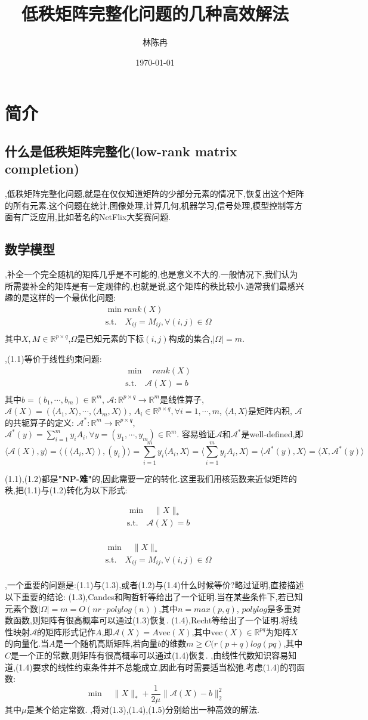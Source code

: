 \documentclass[UTF8]{ctexart}
\title{低秩矩阵完整化问题的几种高效解法}
\author{林陈冉}
\date{\today}
\newcommand{\s}{\quad}
\renewcommand{\b}{\textbf}
\newcommand{\p}{\paragraph{}\s}
\newcommand{\sect}{\section}
\newcommand{\ssect}{\subsection}
\newcommand{\equSplit}[1]{\begin{equation}\begin{split}#1\end{split}\end{equation}}
\newcommand{\equ}[1]{\begin{equation}#1\end{equation}}
\newcommand{\Tst}{\text{s.t.}\s}
\newcommand{\abs}[1]{\lvert#1\rvert}
\newcommand{\norm}[1]{\lVert#1\rVert}
\newcommand{\inprod}[1]{\langle#1\rangle}
\newcommand{\Real}[1]{\mathbb{R}^{#1}}
\newcommand{\nunorm}{\norm{X}_*}
\newcommand{\Ma}{\mathcal{A}}
\numberwithin{equation}{section}
\begin{document}
\maketitle
	\sect{简介}
		\ssect{什么是低秩矩阵完整化(low-rank matrix completion)}

		,低秩矩阵完整化问题,就是在仅仅知道矩阵的少部分元素的情况下,恢复出这个矩阵的所有元素.这个问题在统计,图像处理,计算几何,机器学习,信号处理,模型控制等方面有广泛应用,比如著名的NetFlix大奖赛问题.

		\ssect{数学模型}

		,补全一个完全随机的矩阵几乎是不可能的,也是意义不大的.一般情况下,我们认为所需要补全的矩阵是有一定规律的,也就是说,这个矩阵的秩比较小.通常我们最感兴趣的是这样的一个最优化问题:
		\equSplit{
			&\min rank(X)\\
			&\Tst X_{ij}=M_{ij},\forall(i,j)\in\Omega\\
		}
		其中$X,M\in\Real{p\times q}$,$\Omega$是已知元素的下标$(i,j)$构成的集合,$\abs{\Omega}=m$.

		,(1.1)等价于线性约束问题:
		\equSplit{
			&\min\s rank(X)\\
			&\Tst \mathcal{A}(X)=b\\
		}
		其中$b=(b_1,\cdots,b_m)\in\Real{m}$,
		$\mathcal{A}:\Real{p\times q}\rightarrow\Real{m}$是线性算子,
		$\Ma(X)=(\inprod{A_1,X},\cdots,\inprod{A_m,X})$,
		$A_i\in\Real{p\times q},\forall i=1,\cdots,m$,
		$\inprod{A,X}$是矩阵内积,
		$\Ma$的共轭算子的定义:
		$\Ma^*:\Real{m}\rightarrow\Real{p\times q}$,
		$\Ma^*(y)=\sum^m_{i=1}y_iA_i,\forall y=(y_1,\cdots,y_m)\in\Real{m}$.
		容易验证$\Ma$和$\Ma^*$是well-defined,即
		\[
			\inprod{\Ma(X),y}=\inprod{(\inprod{A_i,X}),(y_i)}=
			\sum^m_{i=1}y_i\inprod{A_i,X}=\inprod{\sum^m_{i=1}y_iA_i,X}
			=\inprod{\Ma^*(y),X}=\inprod{X,\Ma^*(y)}
		\]

		(1.1),(1.2)都是\b{"NP-难"}的,因此需要一定的转化.这里我们用核范数来近似矩阵的秩,把(1.1)与(1.2)转化为以下形式:

		\equSplit{
			&\min\s\nunorm\\
			&\Tst \mathcal{A}(X)=b\\	
		}

		\equSplit{
			&\min\s\nunorm\\
			&\Tst X_{ij}=M_{ij},\forall(i,j)\in\Omega\\
		}

		,一个重要的问题是:(1.1)与(1.3),或者(1.2)与(1.4)什么时候等价?略过证明,直接描述以下重要的结论:
		(1.3),Candes和陶哲轩等给出了一个证明.当在某些条件下,若已知元素个数$\abs{\Omega}=m=O(nr\cdot polylog(n))$,其中$n=max(p,q)$, $polylog$是多重对数函数,则矩阵有很高概率可以通过(1.3)恢复.
		(1.4),Recht等给出了一个证明.将线性映射$\mathcal{A}$的矩阵形式记作$A$,即$\mathcal{A}(X)=A\text{vec}(X)$,其中$\text{vec}(X)\in\Real{pq}$为矩阵$X$的向量化.当$A$是一个随机高斯矩阵,若向量$b$的维数$m\geq C(r(p+q)log(pq)$,其中$C$是一个正的常数,则矩阵有很高概率可以通过(1.4)恢复.
		,由线性代数知识容易知道,(1.4)要求的线性约束条件并不总能成立,因此有时需要适当松弛.考虑(1.4)的罚函数:
		\equ{\min\s\nunorm+\frac{1}{2\mu}\norm{\mathcal{A}(X)-b}_2^2}
		其中$\mu$是某个给定常数.
		,将对(1.3),(1.4),(1.5)分别给出一种高效的解法.
\end{document}
